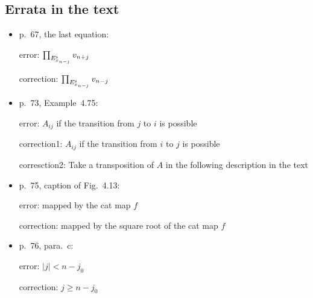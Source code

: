\documentclass[a4paper,11pt,fleqn]{article}
\begin{document}
\maketitle
\subsection*{Errata in the text}
\begin{itemize}
    \item p.~67, the last equation: 

    error: $\prod_{E^{\rm s}_{x_{n-j}}}v_{n+j}$

    correction: $\prod_{E^{\rm s}_{x_{n-j}}}v_{n-j}$
    \item p.~73, Example~4.75:

    error: $A_{ij}$ if the transition from $j$ to $i$ is possible

    correction1: $A_{ij}$ if the transition from $i$ to $j$ is possible

    corresction2: Take a transposition of $A$ in the following description in the text 
    \item p.~75, caption of Fig.~4.13:

    error: mapped by the cat map $f$

    correction: mapped by the square root of the cat map $f$
    \item p.~76, para.~c: 

    error: $|j|<n-j_0$

    correction: $j\ge n-j_0$
\end{itemize}
\hruleskip
\end{document}

